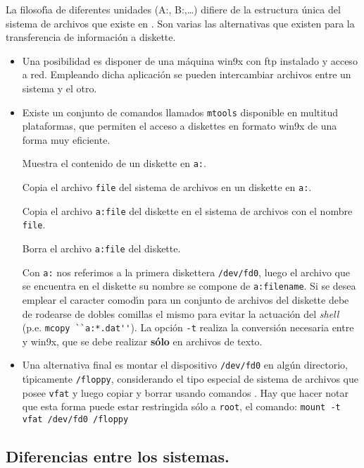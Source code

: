 La filosof{\'\i}a de diferentes unidades (A:, B:,\ldots ) difiere de la
estructura {\'u}nica del sistema de archivos que existe en {\unix}. Son
varias las alternativas que existen para la transferencia de
informaci{\'o}n a diskette.
\begin{itemize}
\item Una posibilidad es disponer de una m{\'a}quina {\sc win9x} con ftp
  instalado y acceso a red.  Empleando dicha aplicaci{\'o}n se pueden
  intercambiar archivos entre un sistema y el otro.
  
\item Existe un conjunto de comandos llamados \verb+mtools+ disponible
  en multitud plataformas, que permiten el acceso a diskettes en
  formato {\sc win9x} de una forma muy eficiente.

\noindent
{} Muestra el contenido de un diskette en  \verb+a:+.

\noindent
{} Copia el archivo \verb+file+ del sistema de
archivos {\unix} en un diskette en \verb+a:+.

\noindent
{} Copia el archivo \verb+a:file+ del
diskette en el sistema de archivos {\unix} con el nombre \verb+file+.

\noindent
{} Borra el archivo \verb+a:file+ del
diskette.

Con \verb+a:+ nos referimos a la primera diskettera \verb+/dev/fd0+,
luego el archivo que se encuentra en el diskette su nombre se compone
de \verb+a:filename+. Si se desea emplear el caracter comod{\'\i}n para un
conjunto de archivos del diskette debe de rodearse de dobles comillas
el mismo para evitar la actuaci{\'o}n del {\it shell} 
(p.e. \verb+mcopy ``a:*.dat''+).  La opci{\'o}n \verb+-t+ realiza la conversi{\'o}n necesaria
entre {\unix} y {\sc win9x}, que se debe realizar {\bf s{\'o}lo} en
archivos de texto.

\item Una alternativa final es montar el dispositivo \verb+/dev/fd0+
  en alg{\'u}n directorio, t{\'\i}picamente \verb+/floppy+, considerando el
  tipo especial de sistema de archivos que posee \verb+vfat+ y luego
  copiar y borrar usando comandos {\unix}. Hay que hacer notar que
  esta forma puede estar restringida s{\'o}lo a \verb+root+, el comando:
\verb+mount -t vfat /dev/fd0 /floppy+

\end{itemize}

\subsection{Diferencias entre los sistemas.}

